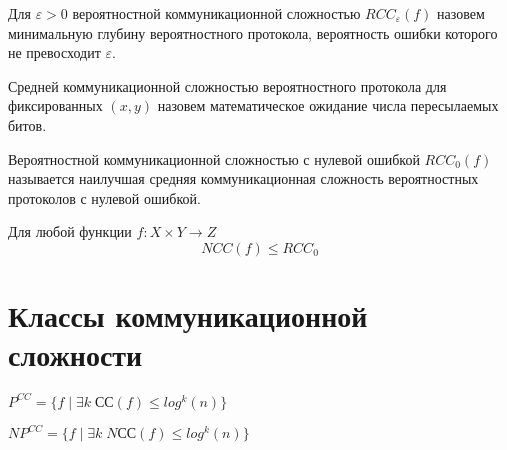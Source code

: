 \documentclass[12pt]{article}
\begin{document}
\begin{Def}
Для $\varepsilon>0$ вероятностной коммуникационной сложностью
$RCC_{\varepsilon}(f)$ назовем
минимальную глубину вероятностного протокола, вероятность ошибки которого не превосходит $\varepsilon$.
\end{Def}

\begin{Def}
Средней коммуникационной сложностью вероятностного протокола для фиксированных $(x, y)$ назовем математическое ожидание числа пересылаемых битов.
\end{Def}

\begin{Def}
Вероятностной коммуникационной сложностью с нулевой ошибкой
$RCC_0(f)$ называется наилучшая средняя коммуникационная сложность
вероятностных протоколов с нулевой ошибкой.
\end{Def}

\begin{Statement}
    Для любой функции $f \colon X \times Y \rightarrow Z$
    $$NCC(f) \leq RCC_0$$
\end{Statement}

\section{Классы коммуникационной сложности}
\begin{Def}
    $P^{CC} = \{f \; | \; \exists k \; СС(f) \leq log^k(n)\}$
\end{Def}

\begin{Def}
    $NP^{CC} = \{f \; | \; \exists k \; NСС(f) \leq log^k(n)\}$
\end{Def}
\end{document}
